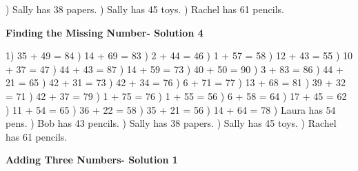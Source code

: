 \documentclass{article}%
\begin{document}
) Sally has 38 papers.%
) Sally has 45 toys.%
) Rachel has 61 pencils.%
\newline%
\newpage%
\large%
\begin{center}%
\textbf{Finding the Missing Number- Solution 4}%
\newline%
\end{center} \normalsize%
1) 35 + 49 = 84%
) 14 + 69 = 83%
) 2 + 44 = 46%
) 1 + 57 = 58%
) 12 + 43 = 55%
) 10 + 37 = 47%
) 44 + 43 = 87%
) 14 + 59 = 73%
) 40 + 50 = 90%
) 3 + 83 = 86%
) 44 + 21 = 65%
) 42 + 31 = 73%
) 42 + 34 = 76%
) 6 + 71 = 77%
) 13 + 68 = 81%
) 39 + 32 = 71%
) 42 + 37 = 79%
) 1 + 75 = 76%
) 1 + 55 = 56%
) 6 + 58 = 64%
) 17 + 45 = 62%
) 11 + 54 = 65%
) 36 + 22 = 58%
) 35 + 21 = 56%
) 14 + 64 = 78%
) Laura has 54 pens.%
) Bob has 43 pencils.%
) Sally has 38 papers.%
) Sally has 45 toys.%
) Rachel has 61 pencils.%
\newline%
\newpage%
\large%
\begin{center}%
\textbf{Adding Three Numbers- Solution 1}%
\newline%
\end{center} \normalsize%
\end{document}
